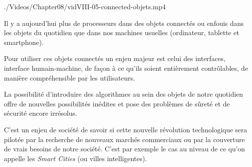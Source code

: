 \begin{marginvideo}
		{./Videos/Chapter08/vidVIII-05-connected-objets.mp4}%
\end{marginvideo}

\begin{jazzitemize}
\item Il y a aujourd'hui plus de processeurs dans des objets connectés ou enfouis dans les objets du quotidien que dans nos machines usuelles (ordinateur, tablette et smartphone).
\item Pour utiliser ces objets connectés un enjeu majeur est celui des interfaces, interface humain-machine,  de façon à ce qu'ils soient entièrement contrôlables, de manière compréhensible par les utilisateurs.
\item La possibilité d'introduire des algorithmes au sein des objets de notre quotidien offre de nouvelles possibilités inédites et pose des problèmes de sûreté et de sécurité encore irrésolus.
\item C'est un enjeu de société de savoir si cette nouvelle révolution technologique sera pilotée  par la recherche de nouveaux marchés commerciaux ou par la couverture de vrais besoins de notre société. C'est par exemple le cas au niveau de ce qu'on appelle les \textit{Smart Cities} (ou villes intelligentes).
\end{jazzitemize}

